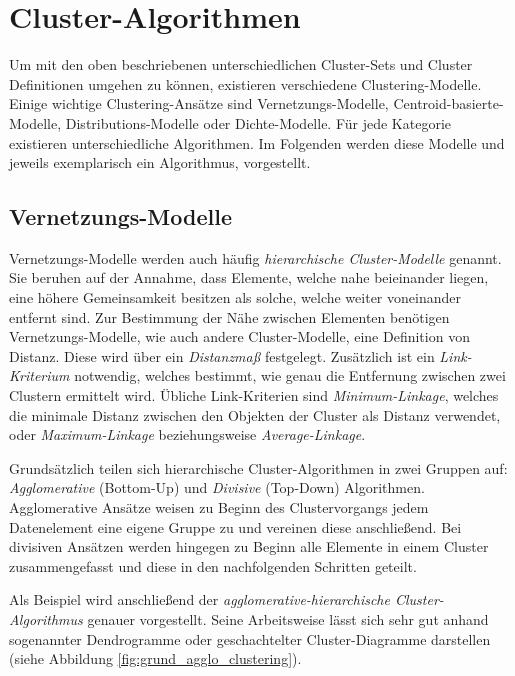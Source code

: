 \section{Cluster-Algorithmen}
\label{sec:cluster_algos}

Um mit den oben beschriebenen unterschiedlichen Cluster-Sets und Cluster Definitionen umgehen zu können,
existieren verschiedene Clustering-Modelle.
Einige wichtige Clustering-Ansätze sind Vernetzungs-Modelle, Centroid-basierte-Modelle, Distributions-Modelle
oder Dichte-Modelle. Für jede Kategorie existieren unterschiedliche Algorithmen. Im Folgenden werden
diese Modelle und jeweils exemplarisch ein Algorithmus, vorgestellt.

\subsection{Vernetzungs-Modelle}
\label{sec:grund_vernetzungs_clustering}

Vernetzungs-Modelle werden auch häufig \textit{hierarchische Cluster-Modelle} genannt. Sie beruhen auf
der Annahme, dass Elemente, welche nahe beieinander liegen, eine höhere Gemeinsamkeit besitzen als solche,
welche weiter voneinander entfernt sind. Zur Bestimmung der Nähe zwischen Elementen benötigen Vernetzungs-Modelle,
wie auch andere Cluster-Modelle, eine Definition von Distanz. Diese wird über ein \textit{Distanzmaß} festgelegt.
Zusätzlich ist ein \textit{Link-Kriterium} notwendig,
welches bestimmt, wie genau die Entfernung zwischen zwei Clustern ermittelt wird. Übliche Link-Kriterien
sind \textit{Minimum-Linkage}, welches die minimale Distanz zwischen den Objekten der Cluster als Distanz verwendet,
oder \textit{Maximum-Linkage} beziehungsweise \textit{Average-Linkage}. \cite[]{Jain1999, GeorgeSeif2018}

Grundsätzlich teilen sich hierarchische Cluster-Algorithmen in zwei Gruppen auf:
\textit{Agglomerative} (Bottom-Up) und \textit{Divisive} (Top-Down) Algorithmen.
Agglomerative Ansätze weisen zu Beginn des Clustervorgangs jedem Datenelement eine eigene Gruppe zu
und vereinen diese anschließend.
Bei divisiven Ansätzen werden hingegen zu Beginn alle Elemente in einem Cluster zusammengefasst und
diese in den nachfolgenden Schritten geteilt.

Als Beispiel wird anschließend der \textit{agglomerative-hierarchische Cluster-Algorithmus} genauer vorgestellt.
Seine Arbeitsweise lässt sich sehr gut anhand sogenannter Dendrogramme oder geschachtelter Cluster-Diagramme darstellen
(siehe Abbildung \ref{fig:grund_agglo_clustering}).

